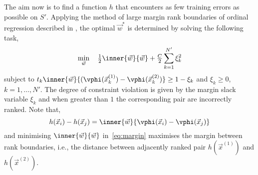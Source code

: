 The aim now is to find a function $h$ that encounters as few training errors as possible on $S'$. Applying the method of large margin rank boundaries of ordinal regression described in \cite{Herbrich00}, the optimal $\vec{w}^*$ is determined by solving the following task, 
\begin{equation}\label{eq:margin}
  \min_{\vec{w}}\quad \tfrac{1}{2}\inner{\vec{w}}{\vec{w}} + \tfrac{C}{2}\sum_{k=1}^{N'}\xi_k^2
\end{equation}
subject to $t_k\inner{\vec{w}}{(\vphi(\vec{x}_k^{(1)})-\vphi(\vec{x}_k^{(2)})}\ge 1 - \xi_k$ and $\xi_k \ge 0$, $k = 1,\ldots, N'$. The degree of constraint violation is given by the margin slack variable $\xi_k$ and when greater than $1$ the corresponding pair are incorrectly ranked. 
Note that,
\begin{equation}
h(\vec{x}_i)-h(\vec{x}_j)=\inner{\vec{w}}{\vphi(\vec{x}_i)-\vphi(\vec{x}_j)}
\end{equation}
and minimising $\inner{\vec{w}}{\vec{w}}$ in~\eqref{eq:margin} maximises the margin between rank boundaries, i.e., the distance between adjacently ranked pair $h(\vec{x}^{(1)})$ and $h(\vec{x}^{(2)})$.




